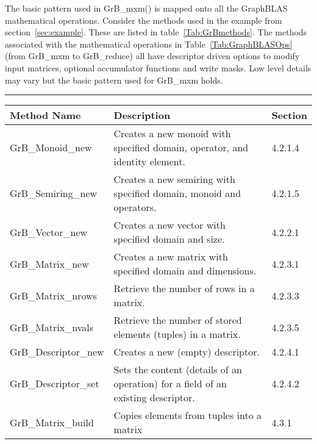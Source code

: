 The basic pattern used in {\sf GrB\_mxm()} is mapped onto all the GraphBLAS mathematical operations.  
Consider the methods used in the example from section~\ref{sec:example}.  These are listed in 
table~\ref{Tab:GrBmethods}.   The methods associated with the mathematical operations in 
Table~\ref{Tab:GraphBLASOps} (from {\sf GrB\_mxm} to {\sf GrB\_reduce})
all have descriptor driven options to modify input matrices, optional accumulator 
functions and write masks.   Low level details may vary but the basic pattern used
for {\sf GrB\_mxm} holds.
 
\begin{table*}[h]
\hrule
\begin{center}
\caption{The following methods are used in the Betweenness Centrality example in section~\ref{sec:example}.  The third 
column in this table refers to the section in the GraphBLAS C specification 1.0 where the method is more fully defined.}
\label{Tab:GrBmethods}
\begin{tabular}{lll}
Method Name                     & Description  & Section \\
\hline
	{\sf GrB\_Monoid\_new}      & Creates a new monoid with specified domain, operator, and identity element.       & 4.2.1.4 \\
	{\sf GrB\_Semiring\_new}    & Creates a new semiring with specified domain, monoid and operators.               & 4.2.1.5 \\
	{\sf GrB\_Vector\_new}      & Creates a new vector with specified domain and size.                              & 4.2.2.1 \\
	{\sf GrB\_Matrix\_new}      & Creates a new matrix with specified domain and dimensions.                        & 4.2.3.1 \\
	{\sf GrB\_Matrix\_nrows}    & Retrieve the number of rows in a matrix.                                          & 4.2.3.3 \\
	{\sf GrB\_Matrix\_nvals}    & Retrieve the number of stored elements (tuples) in a matrix.                      & 4.2.3.5 \\
	{\sf GrB\_Descriptor\_new}  & Creates a new (empty) descriptor.                                                 & 4.2.4.1 \\
	{\sf GrB\_Descriptor\_set}  & Sets the content (details of an operation) for a field of an existing descriptor. & 4.2.4.2 \\
	{\sf GrB\_Matrix\_build}    & Copies elements from tuples into a matrix                                         & 4.3.1 \\

\end{tabular}
\end{center}
\end{table*}
